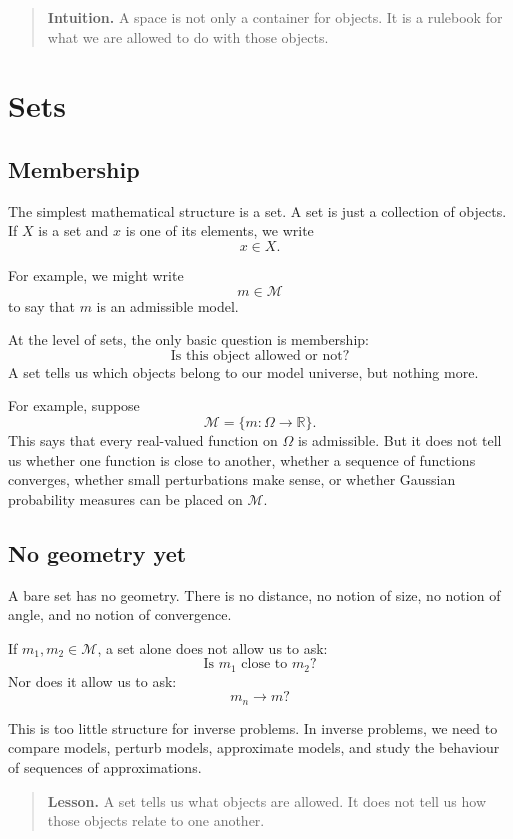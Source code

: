 \documentclass[11pt,a4paper]{book}
\newenvironment{intuition}
  {\begin{quote}\textbf{Intuition.}}
  {\end{quote}}
\newenvironment{lesson}
  {\begin{quote}\textbf{Lesson.}}
  {\end{quote}}
\newcommand{\M}{\mathcal{M}}      %
\newcommand{\R}{\mathbb{R}}
\begin{document}
\begin{intuition}
A space is not only a container for objects. It is a rulebook for what we are
allowed to do with those objects.
\end{intuition}

\section{Sets}

\subsection{Membership}

The simplest mathematical structure is a set. A set is just a collection of
objects. If $X$ is a set and $x$ is one of its elements, we write
\[
    x \in X.
\]

For example, we might write
\[
    m \in \M
\]
to say that $m$ is an admissible model.

At the level of sets, the only basic question is membership:
\[
    \text{Is this object allowed or not?}
\]
A set tells us which objects belong to our model universe, but nothing more.

For example, suppose
\[
    \M =
    \{m:\Omega\to\R\}.
\]
This says that every real-valued function on $\Omega$ is admissible. But it
does not tell us whether one function is close to another, whether a sequence
of functions converges, whether small perturbations make sense, or whether
Gaussian probability measures can be placed on $\M$.

\subsection{No geometry yet}

A bare set has no geometry. There is no distance, no notion of size, no notion
of angle, and no notion of convergence.

If $m_1,m_2\in \M$, a set alone does not allow us to ask:
\[
    \text{Is } m_1 \text{ close to } m_2?
\]
Nor does it allow us to ask:
\[
    m_n \to m?
\]

This is too little structure for inverse problems. In inverse problems, we need
to compare models, perturb models, approximate models, and study the behaviour
of sequences of approximations.

\begin{lesson}
A set tells us what objects are allowed. It does not tell us how those objects
relate to one another.
\end{lesson}
\end{document}
